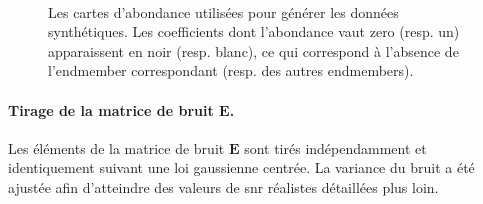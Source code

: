 \begin{figure}[h!]
    \centering
    \hspace{0.1\textwidth}
    \\
    \hspace{0.1\textwidth}
    \caption{Les cartes d'abondance utilisées pour générer les données synthétiques. Les coefficients dont l'abondance vaut zero (resp. un) apparaissent en noir (resp. blanc), ce qui correspond à l'absence de l'endmember correspondant (resp. des autres endmembers).
        \protect\label{fig-cartes-abondance-synth}}
\end{figure}

\paragraph{Tirage de la matrice de bruit $\mathbf{E}$.} Les éléments de la matrice de bruit $\mathbf{E}$ sont tirés indépendamment et identiquement suivant une loi gaussienne centrée. La variance du bruit a été ajustée afin d'atteindre des valeurs de \gls{snr} réalistes détaillées plus loin.

